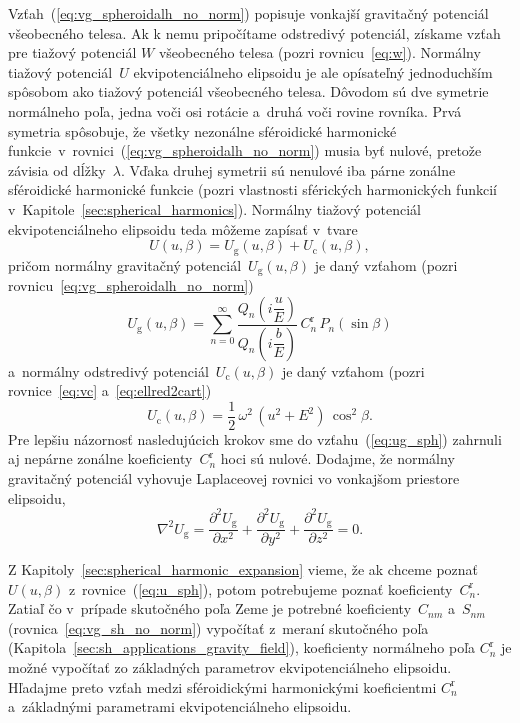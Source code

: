 \documentclass[a4paper, 12pt]{book}
\newcommand{\gidx}{\mathrm g}
\newcommand{\cidx}{\mathrm c}
\begin{document}
Vzťah~(\ref{eq:vg_spheroidalh_no_norm}) popisuje vonkajší gravitačný potenciál 
všeobecného telesa.  Ak k nemu pripočítame odstredivý potenciál, získame vzťah 
pre tiažový potenciál $W$ všeobecného telesa (pozri rovnicu~\ref{eq:w}).  
Normálny tiažový potenciál~$U$ ekvipotenciálneho elipsoidu je ale opísateľný 
jednoduchším spôsobom ako tiažový potenciál všeobecného telesa.  Dôvodom sú dve 
symetrie normálneho poľa, jedna voči osi rotácie a~druhá voči rovine rovníka.  
Prvá symetria spôsobuje, že všetky nezonálne sféroidické harmonické 
funkcie~v~rovnici~(\ref{eq:vg_spheroidalh_no_norm}) musia byť nulové, pretože 
závisia od dĺžky~$\lambda$.  Vďaka druhej symetrii sú nenulové iba párne 
zonálne sféroidické harmonické funkcie (pozri vlastnosti sférických 
harmonických funkcií v~Kapitole~\ref{sec:spherical_harmonics}).  Normálny 
tiažový potenciál ekvipotenciálneho elipsoidu teda môžeme zapísať v~tvare
%
\begin{equation}
\label{eq:u_sph}
U(u, \beta) = U_\gidx(u, \beta) + U_\cidx(u, \beta){,}
\end{equation}
%
pričom normálny gravitačný potenciál~$U_\gidx(u, \beta)$ je daný vzťahom (pozri 
rovnicu~\ref{eq:vg_spheroidalh_no_norm})
%
\begin{equation}
\label{eq:ug_sph}
U_\gidx(u, \beta) = \sum_{n = 0}^\infty \frac{Q_n\left( i \dfrac{u}{E} 
\right)}{Q_n\left( i \dfrac{b}{E} \right)} \,  C^{\mathrm{r}}_n \, 
P_n(\sin\beta)
\end{equation}
%
a~normálny odstredivý potenciál~$U_\cidx(u, \beta)$ je daný vzťahom (pozri 
rovnice~\ref{eq:vc} a~\ref{eq:ellred2cart})
%
\begin{equation}
\label{eq:uc_sph}
U_\cidx(u, \beta) = \frac{1}{2} \, \omega^2 \, (u^2 + E^2) \, \cos^2\beta{.}
\end{equation}
%
Pre lepšiu názornosť nasledujúcich krokov sme do vzťahu~(\ref{eq:ug_sph}) 
zahrnuli aj nepárne zonálne koeficienty~$C^{\mathrm{r}}_n$ hoci sú nulové.  
Dodajme, že normálny gravitačný potenciál vyhovuje Laplaceovej rovnici vo 
vonkajšom priestore elipsoidu,
%
\begin{equation}
\label{eq:ug_laplace_cart}
\nabla^2 U_\gidx = \frac{\partial^2 U_\gidx}{\partial x^2} + \frac{\partial^2 
U_\gidx}{\partial y^2} + \frac{\partial^2 U_\gidx}{\partial z^2} = 0{.}
\end{equation}

Z Kapitoly~\ref{sec:spherical_harmonic_expansion} vieme, že ak chceme poznať 
$U(u,\beta)$ z~rovnice~(\ref{eq:u_sph}), potom potrebujeme poznať 
koeficienty~$C_n^\mathrm{r}$.  Zatiaľ čo v~prípade skutočného poľa Zeme je 
potrebné koeficienty~$C_{nm}$ a~$S_{nm}$ (rovnica~\ref{eq:vg_sh_no_norm}) 
vypočítať z~meraní skutočného poľa 
(Kapitola~\ref{sec:sh_applications_gravity_field}), koeficienty normálneho poľa 
$C_n^\mathrm{r}$ je možné vypočítať zo základných parametrov ekvipotenciálneho 
elipsoidu.  Hľadajme preto vzťah medzi sféroidickými harmonickými koeficientmi 
$C_n^\mathrm{r}$ a~základnými parametrami ekvipotenciálneho elipsoidu.
\end{document}

